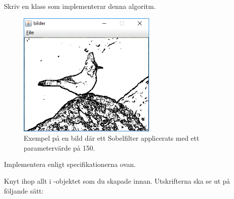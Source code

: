 Skriv en klass  som implementerar denna algoritm.

\begin{figure}[H]
\begin{center}
\includegraphics[width=0.6\textwidth]{../img/w12-assignment-photo/sobeljay.png}
\caption { Exempel på en bild där ett Sobelfilter applicerats med ett parametervärde på 150.}
\label{fig:photo:sobelfilter:sobel}
\end{center}
\end{figure}


\Task Implementera  enligt specifikationerna ovan.

\Task Knyt ihop allt i -objektet som du skapade innan. Utskrifterna ska se ut på följande sätt:\newline

